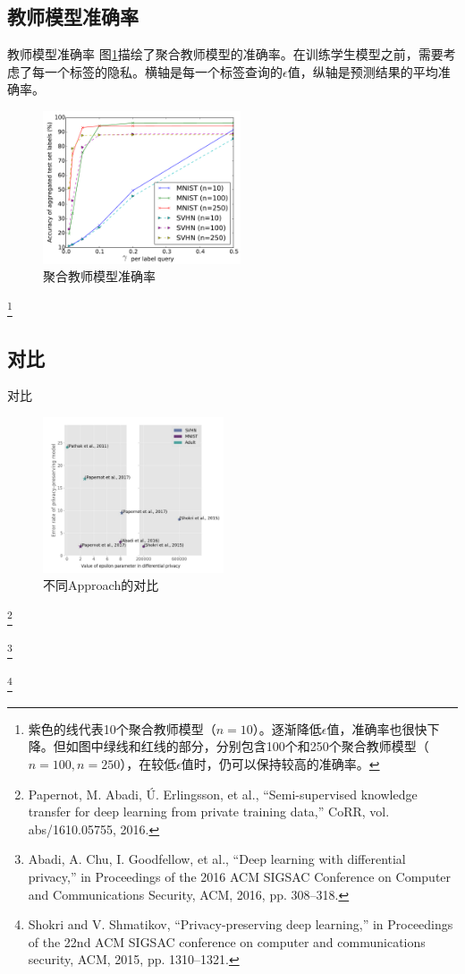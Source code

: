 \documentclass[aspectratio=169]{beamer}
\newcommand\blfootnote[1]{%
  \begingroup
  \renewcommand\thefootnote{}\footnote{#1}%
  \addtocounter{footnote}{-1}%
  \endgroup
}
\begin{document}
\subsection{教师模型准确率}
\begin{frame}{教师模型准确率}
图\ref{fig:teacher-accuracy}描绘了聚合教师模型的准确率。在训练学生模型之前，需要考虑了每一个标签的隐私。横轴是每一个标签查询的$\epsilon$值，纵轴是预测结果的平均准确率。
\begin{figure}
\includegraphics[width = 2.3in]{fig/lap-scale-accuracy.pdf}
\caption{聚合教师模型准确率}
\label{fig:teacher-accuracy}
\end{figure}
\blfootnote{
紫色的线代表10个聚合教师模型（$n=10$）。逐渐降低$\epsilon$值，准确率也很快下降。但如图中绿线和红线的部分，分别包含100个和250个聚合教师模型（$n=100, n=250$），在较低$\epsilon$值时，仍可以保持较高的准确率。}
\end{frame}

\subsection{对比}
\begin{frame}{对比}

\begin{figure}
\includegraphics[width = 2.1in]{fig/approach-comparison.png}
\caption{不同Approach的对比}
\end{figure}
\blfootnote{Papernot, M. Abadi, Ú. Erlingsson, et al., “Semi-supervised knowledge transfer for deep learning from private training data,” CoRR,
vol. abs/1610.05755, 2016.}
\blfootnote{Abadi, A. Chu, I. Goodfellow, et al., “Deep learning with differential privacy,” in Proceedings of the 2016 ACM SIGSAC Conference on
Computer and Communications Security, ACM, 2016, pp. 308–318.}
\blfootnote{Shokri and V. Shmatikov, “Privacy-preserving deep learning,” in Proceedings of the 22nd ACM SIGSAC conference on computer and
communications security, ACM, 2015, pp. 1310–1321.}
\end{frame}
\end{document}
